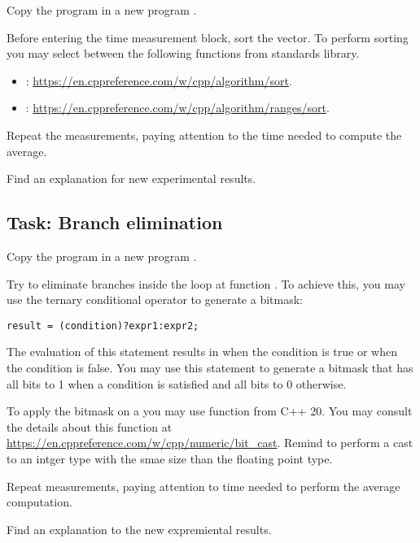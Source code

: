 Copy the program  in a new program .

Before entering the time measurement block, sort the vector.
To perform sorting you may select between the following functions from standards library.

\begin{itemize}
  \item {}: \url{https://en.cppreference.com/w/cpp/algorithm/sort}.
  \item {}: \url{https://en.cppreference.com/w/cpp/algorithm/ranges/sort}.
\end{itemize}

Repeat the measurements, paying attention to the time needed to compute the average.

Find an explanation for new experimental results.

\subsection{Task: Branch elimination}

Copy the program  in a new program .

Try to eliminate branches inside the loop at function . 
To achieve this, you may use the ternary conditional operator to generate a bitmask:

\begin{lstlisting}
result = (condition)?expr1:expr2;
\end{lstlisting}

The evaluation of this statement results in  when the condition is true
or  when the condition is false.
You may use this statement to generate a bitmask that has all bits to 1 when a
condition is satisfied and all bits to 0 otherwise.

To apply the bitmask on a  you may use function
 from C++ 20. 
You may consult the details about this function at
\url{https://en.cppreference.com/w/cpp/numeric/bit_cast}.
Remind to perform a cast to an intger type with the smae size than the floating
point type.

Repeat measurements, paying attention to time needed to perform the average computation.

Find an explanation to the new expremiental results.
